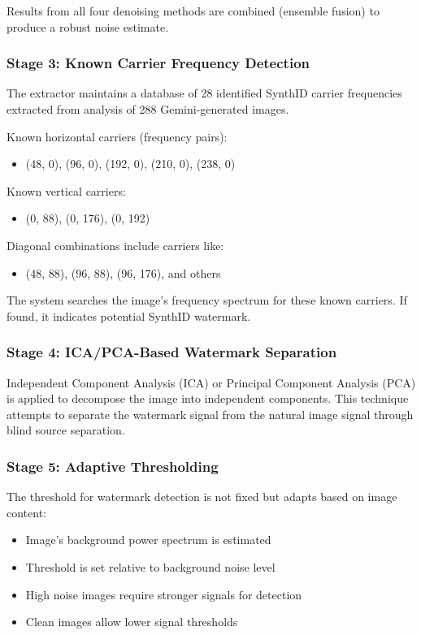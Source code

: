 \documentclass[12pt,a4paper]{book}
\begin{document}
Results from all four denoising methods are combined (ensemble fusion) to produce a robust noise estimate.

\subsubsection{Stage 3: Known Carrier Frequency Detection}
The extractor maintains a database of 28 identified SynthID carrier frequencies extracted from analysis of 288 Gemini-generated images.

Known horizontal carriers (frequency pairs):
\begin{itemize}
    \item (48, 0), (96, 0), (192, 0), (210, 0), (238, 0)
\end{itemize}

Known vertical carriers:
\begin{itemize}
    \item (0, 88), (0, 176), (0, 192)
\end{itemize}

Diagonal combinations include carriers like:
\begin{itemize}
    \item (48, 88), (96, 88), (96, 176), and others
\end{itemize}

The system searches the image's frequency spectrum for these known carriers. If found, it indicates potential SynthID watermark.

\subsubsection{Stage 4: ICA/PCA-Based Watermark Separation}
Independent Component Analysis (ICA) or Principal Component Analysis (PCA) is applied to decompose the image into independent components. This technique attempts to separate the watermark signal from the natural image signal through blind source separation.

\subsubsection{Stage 5: Adaptive Thresholding}
The threshold for watermark detection is not fixed but adapts based on image content:
\begin{itemize}
    \item Image's background power spectrum is estimated
    \item Threshold is set relative to background noise level
    \item High noise images require stronger signals for detection
    \item Clean images allow lower signal thresholds
\end{itemize}
\end{document}
